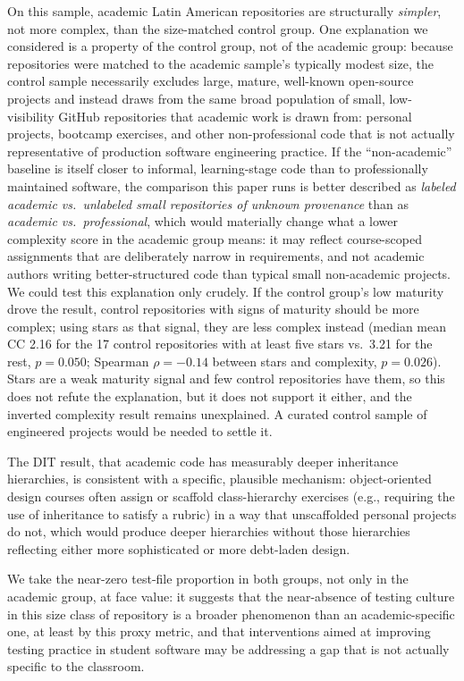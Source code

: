 \documentclass{cleiej}
\begin{document}
On this sample, academic Latin American repositories are structurally \emph{simpler}, not more complex, than the size-matched control group. One explanation we considered is a property of the control group, not of the academic group: because repositories were matched to the academic sample's typically modest size, the control sample necessarily excludes large, mature, well-known open-source projects and instead draws from the same broad population of small, low-visibility GitHub repositories that academic work is drawn from: personal projects, bootcamp exercises, and other non-professional code that is not actually representative of production software engineering practice. If the ``non-academic'' baseline is itself closer to informal, learning-stage code than to professionally maintained software, the comparison this paper runs is better described as \emph{labeled academic vs.\ unlabeled small repositories of unknown provenance} than as \emph{academic vs.\ professional}, which would materially change what a lower complexity score in the academic group means: it may reflect course-scoped assignments that are deliberately narrow in requirements, and not academic authors writing better-structured code than typical small non-academic projects. We could test this explanation only crudely. If the control group's low maturity drove the result, control repositories with signs of maturity should be more complex; using stars as that signal, they are less complex instead (median mean CC 2.16 for the 17 control repositories with at least five stars vs.\ 3.21 for the rest, $p=0.050$; Spearman $\rho=-0.14$ between stars and complexity, $p=0.026$). Stars are a weak maturity signal and few control repositories have them, so this does not refute the explanation, but it does not support it either, and the inverted complexity result remains unexplained. A curated control sample of engineered projects would be needed to settle it.

The DIT result, that academic code has measurably deeper inheritance hierarchies, is consistent with a specific, plausible mechanism: object-oriented design courses often assign or scaffold class-hierarchy exercises (e.g., requiring the use of inheritance to satisfy a rubric) in a way that unscaffolded personal projects do not, which would produce deeper hierarchies without those hierarchies reflecting either more sophisticated or more debt-laden design.

We take the near-zero test-file proportion in both groups, not only in the academic group, at face value: it suggests that the near-absence of testing culture in this size class of repository is a broader phenomenon than an academic-specific one, at least by this proxy metric, and that interventions aimed at improving testing practice in student software may be addressing a gap that is not actually specific to the classroom.
\end{document}
